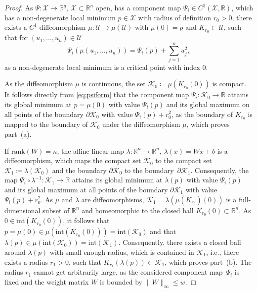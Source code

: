 \documentclass[10pt]{article}
\numberwithin{equation}{section}
\newcommand\normm[1]{\big\lVert#1\big\lVert}
\begin{document}
	\begin{proof}
		As $\Psi:\mathcal{X}\rightarrow \mathbb{R}^q$,  $\mathcal{X}\subset \mathbb{R}^n$ open, has a component map $\Psi_i\in C^3(\mathcal{X}, \mathbb{R})$, which has a non-degenerate local minimum $p \in \mathcal{X}$ with radius of definition $r_0>0$, there exists a $C^1$-diffeomorphism $\mu: \mathcal{U} \rightarrow \mu(\mathcal{U})$ with $\mu(0) = p$ and $K_{r_0}\subset \mathcal{U}$, such that for $(u_1,\ldots,u_n) \in \mathcal{U}$
		\begin{equation}\label{eq:psiform}
			\Psi_i(\mu(u_1,\ldots,u_n)) = \Psi_i(p) + \sum_{j =1}^n u_j^2,
		\end{equation}
		as a non-degenerate local minimum is a critical point with index $0$.
		
		
		As the diffeomorphism $\mu$ is continuous, the set $\mathcal{K}_0 \coloneqq \mu(K_{r_0}(0))$ is compact. It follows directly from \eqref{eq:psiform} that the component map $\Psi_i: \mathcal{K}_0 \rightarrow \mathbb{R}$ attains its global minimum at $p = \mu(0)$ with value $\Psi_i(p)$ and its global maximum on all points of the boundary $\partial \mathcal{K}_0$ with value $\Psi_i(p)+r_0^2$, as the boundary of $K_{r_0}$ is mapped to the boundary of $\mathcal{K}_0$ under the diffeomorphism $\mu$, which proves part~(a).
		
		If $\text{rank}(W) = n$, the affine linear map $\lambda:\mathbb{R}^n\rightarrow \mathbb{R}^n$, $\lambda(x) = Wx+b$ is a diffeomorphism, which maps the compact set $\mathcal{K}_0$ to the compact set $\mathcal{K}_1 \coloneqq \lambda(\mathcal{K}_0)$ and the boundary $\partial \mathcal{K}_0$ to the boundary~$\partial \mathcal{K}_1$. Consequently, the map $\Psi_i \circ \lambda^{-1}: \mathcal{K}_1 \rightarrow \mathbb{R}$ attains its global minimum at $\lambda(p)$ with value $\Psi_i(p)$ and its global maximum at all points of the boundary $\partial \mathcal{K}_1$ with value $\Psi_i(p)+r_0^2$. As $\mu$ and $\lambda$ are diffeomorphisms, $\mathcal{K}_1 = \lambda(\mu(K_{r_0})(0))$ is a full-dimensional subset of $\mathbb{R}^n$ and homeomorphic to the closed ball $K_{r_0}(0)\subset \mathbb{R}^n$. As $0\in \text{int}(K_{r_0}(0))$, it follows that $p = \mu(0) \in \mu(\text{int}(K_{r_0}(0))) = \text{int}(\mathcal{K}_0)$ and that $\lambda(p)  \in \mu(\text{int}(\mathcal{K}_0)) = \text{int}(\mathcal{K}_1) $. Consequently, there exists a closed ball around $\lambda(p)$ with small enough radius, which is contained in $\mathcal{K}_1$, i.e., there exists a radius $r_1 >0$, such that  $K_{r_1}(\lambda(p)) \subset \mathcal{K}_1$, which proves part~(b). The radius $r_1$ cannot get arbitrarily large, as the considered component map~$\Psi_i$ is fixed and the weight matrix $W$ is bounded by $\normm{W}_\infty\leq w$.
		

\end{proof}
\end{document}

